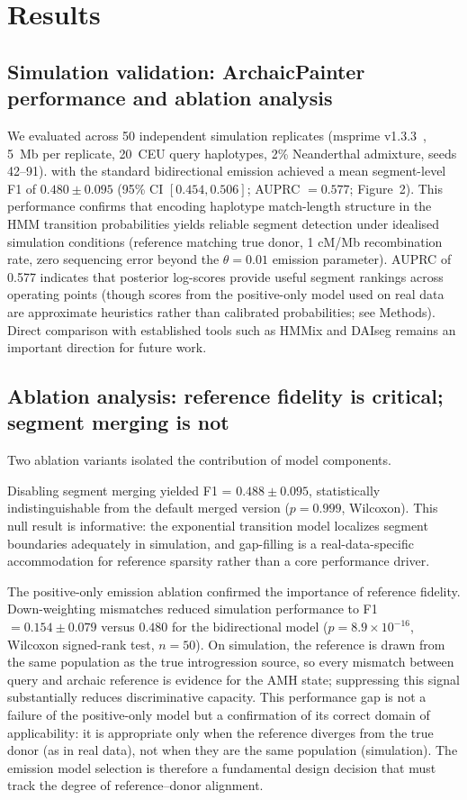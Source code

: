 \section*{Results}

\subsection*{Simulation validation: ArchaicPainter performance and ablation analysis}

We evaluated \AP{} across 50 independent simulation replicates
(msprime v1.3.3~\citep{baumdicker2022efficient}, 5~Mb per replicate,
20~CEU query haplotypes, 2\% Neanderthal admixture, seeds 42--91).
\AP{} with the standard bidirectional emission achieved a mean segment-level
F1 of $0.480 \pm 0.095$ (95\% CI $[0.454, 0.506]$; AUPRC $= 0.577$;
Figure~2).
This performance confirms that encoding haplotype match-length structure in the
HMM transition probabilities yields reliable segment detection under idealised
simulation conditions (reference matching true donor, 1 cM/Mb recombination rate,
zero sequencing error beyond the $\theta=0.01$ emission parameter).
\AP{} AUPRC of 0.577 indicates that posterior log-scores provide useful
segment rankings across operating points (though scores from the positive-only
model used on real data are approximate heuristics rather than calibrated
probabilities; see Methods).
Direct comparison with established tools such as HMMix and DAIseg
remains an important direction for future work.

\subsection*{Ablation analysis: reference fidelity is critical; segment merging is not}

Two ablation variants isolated the contribution of model components.

Disabling segment merging yielded F1 = $0.488 \pm 0.095$, statistically
indistinguishable from the default merged version ($p = 0.999$, Wilcoxon).
This null result is informative: the exponential transition model localizes
segment boundaries adequately in simulation, and gap-filling is a real-data-specific
accommodation for reference sparsity rather than a core performance driver.

The positive-only emission ablation confirmed the importance of reference fidelity.
Down-weighting mismatches reduced simulation performance to F1 $= 0.154 \pm 0.079$
versus $0.480$ for the bidirectional model ($p = 8.9 \times 10^{-16}$, Wilcoxon signed-rank test,
$n = 50$).
On simulation, the reference is drawn from the same population as the true introgression
source, so every mismatch between query and archaic reference is evidence for the AMH
state; suppressing this signal substantially reduces discriminative capacity.
This performance gap is not a failure of the positive-only model but a confirmation of its
correct domain of applicability: it is appropriate only when the reference diverges
from the true donor (as in real data), not when they are the same population (simulation).
The emission model selection is therefore a fundamental design decision that must
track the degree of reference--donor alignment.

